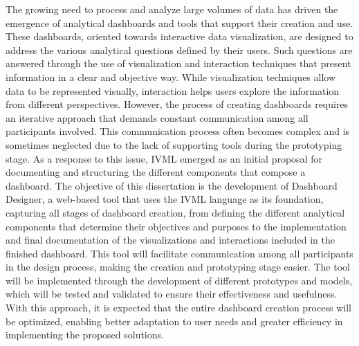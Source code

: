 The growing need to process and analyze large volumes of data has driven the emergence of analytical dashboards and tools that support their creation and use. These dashboards, oriented towards interactive data visualization, are designed to address the various analytical questions defined by their users. Such questions are answered through the use of visualization and interaction techniques that present information in a clear and objective way. While visualization techniques allow data to be represented visually, interaction helps users explore the information from different perspectives. However, the process of creating dashboards requires an iterative approach that demands constant communication among all participants involved. This communication process often becomes complex and is sometimes neglected due to the lack of supporting tools during the prototyping stage. As a response to this issue, IVML emerged as an initial proposal for documenting and structuring the different components that compose a dashboard. The objective of this dissertation is the development of Dashboard Designer, a web-based tool that uses the IVML language as its foundation, capturing all stages of dashboard creation, from defining the different analytical components that determine their objectives and purposes to the implementation and final documentation of the visualizations and interactions included in the finished dashboard. This tool will facilitate communication among all participants in the design process, making the creation and prototyping stage easier. The tool will be implemented through the development of different prototypes and models, which will be tested and validated to ensure their effectiveness and usefulness. With this approach, it is expected that the entire dashboard creation process will be optimized, enabling better adaptation to user needs and greater efficiency in implementing the proposed solutions.

